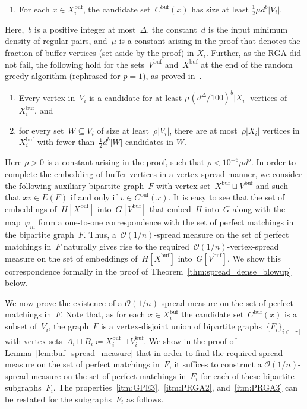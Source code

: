 \documentclass[final]{article}
\def\mcite[#1]#2{\mbox{\cite[#1]{#2}}}
\theoremstyle{definition}
\newcommand{\itmarab}[1]{\mbox{\rm 
({\it #1}\,\arabic{*}\hspace{0.05em})}}
\newcommand{\buf}{\mathrm{buf}}
\begin{document}
\begin{enumerate}[start = 3, label = \itmarab{GPE}]
    \item \label{itm:GPE3} For each $x \in X^{\buf}_i$, the candidate set~$C^{\buf}(x)$ has size at least $\tfrac{1}{2}\mu d^b |V_i|$.
\end{enumerate}

Here,~$b$ is a positive integer at most~$\Delta$, the constant~$d$ is the input minimum density of regular pairs, and~$\mu$ is a constant arising in the proof that denotes the fraction of buffer vertices (set aside by the proof) in $X_i$. Further, as the RGA did not fail, the following hold for the sets~$V^{\buf}$ and~$X^{\buf}$ at the end of the random greedy algorithm (rephrased for $p = 1$), as proved in~\mcite[Lemma 4.1]{sparse_blowup}. 

\begin{enumerate}[start = 2, label = \itmarab{PRGA}]
    \item\label{itm:PRGA2} Every vertex in~$V_i$ is a candidate for at least $\mu (d^{\Delta}/100)^b |X_i|$ vertices of~$X^{\buf}_i$, and
    \item\label{itm:PRGA3} for every set~$W \subseteq V_i$ of size at least~$\rho|V_i|$, there are at most~$\rho|X_i|$ vertices in $X^{\buf}_i$ with fewer than~$\tfrac{1}{2} d^b |W|$ candidates in $W$.
\end{enumerate}

Here $\rho>0$ is a constant arising in the proof, such that $\rho < 10^{-6}\mu d^b$. In order to complete the embedding of buffer vertices in a vertex-spread manner, we consider the following auxiliary bipartite graph~$F$ with vertex set~$X^{\buf} \sqcup V^{\buf}$ and such that $xv \in E(F)$ if and only if $v \in C^{\buf}(x)$. It is easy to see that the set of embeddings of~$H[X^{\buf}]$ into~$G[V^{\buf}]$ that embed~$H$ into~$G$ along with the map~$\varphi_m$ form a one-to-one correspondence with the set of perfect matchings in the bipartite graph~$F$. Thus, a~$\mathcal{O}(1/n)$-spread measure on the set of perfect matchings in~$F$ naturally gives rise to the required~$\mathcal{O}(1/n)$-vertex-spread measure on the set of embeddings of~$H[X^{\buf}]$ into~$G[V^{\buf}]$. We show this correspondence formally in the proof of Theorem~\ref{thm:spread_dense_blowup} below. 

We now prove the existence of a $\mathcal{O}(1/n)$-spread measure on the set of perfect matchings in~$F$. Note that, as for each $x \in X^{\buf}_i$ the candidate set~$C^{\buf}(x)$ is a subset of~$V_i$, the graph~$F$ is a vertex-disjoint union of bipartite graphs~$\{F_i\}_{i \in [r]}$ with vertex sets~$A_i \sqcup B_i \coloneqq X^{\buf}_i \sqcup V^{\buf}_i$. We show in the proof of Lemma~\ref{lem:buf_spread_measure} that in order to find the required spread measure on the set of perfect matchings in~$F$, it suffices to construct a $\mathcal{O}(1/n)$-spread measure on the set of perfect matchings in~$F_i$ for each of these bipartite subgraphs~$F_i$. The properties~\ref{itm:GPE3},~\ref{itm:PRGA2}, and~\ref{itm:PRGA3} can be restated for the subgraphs~$F_i$ as follows.
\end{document}
